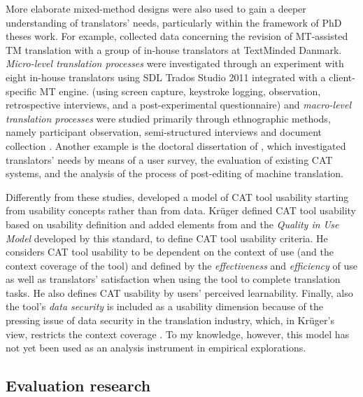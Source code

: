 More elaborate mixed-method designs were also used to gain a deeper understanding of translators’ needs, particularly within the framework of PhD theses work. For example, \citet{bundgaard2016translator} collected data concerning the revision of MT-assisted TM translation with a group of in-house translators at TextMinded Danmark. \textit{Micro-level translation processes} were investigated through an experiment with eight in-house translators using SDL Trados Studio 2011 integrated with a client-specific MT engine. (using screen capture, keystroke logging, observation, retrospective interviews, and a post-experimental questionnaire) and \textit{macro-level translation processes} were studied primarily through ethnographic methods, namely participant observation, semi-structured interviews and document collection \citep[111]{bundgaard2016translator}. Another example is the doctoral dissertation of \citet{zaretskaya2017translators}, which investigated translators’ needs by means of a user survey, the evaluation of existing CAT systems, and the analysis of the process of post-editing of machine translation.

Differently from these studies, \citet{kruger2016contextualising,kruger2019model} developed a model of CAT tool usability starting from usability concepts rather than from data. Krüger defined CAT tool usability based on  usability definition and added elements from \citet{iso2011} and the \textit{Quality in Use Model} developed by this standard, to define CAT tool usability criteria. He considers CAT tool usability to be dependent on the context of use (and the context coverage of the tool) and defined by the \textit{effectiveness} and \textit{efficiency} of use as well as translators’ satisfaction when using the tool to complete translation tasks. He also defines CAT usability by users’ perceived learnability. Finally, also the tool’s \textit{data security} is included as a usability dimension because of the pressing issue of data security in the translation industry, which, in Krüger’s view, restricts the context coverage \citep[113]{kruger2019model}. To my knowledge, however, this model has not yet been used as an analysis instrument in empirical explorations.



\subsection{Evaluation research}


